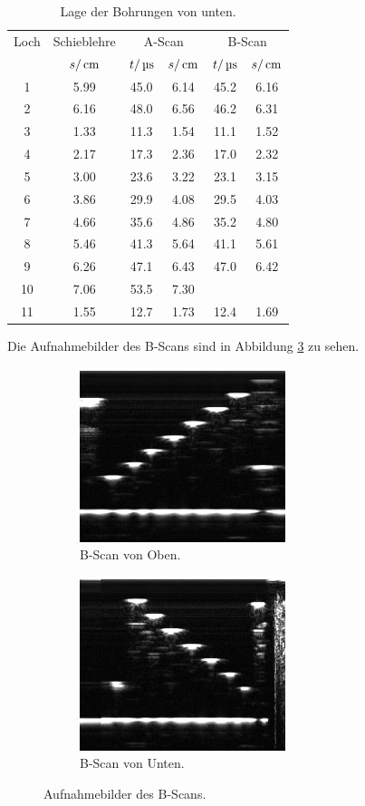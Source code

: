 \begin{table}[H]
  \centering
  \begin{tabular}{cc|cc|cc}
    \toprule
    \multicolumn{1}{c}{Loch}& \multicolumn{1}{c|}{Schieblehre} & \multicolumn{2}{c|}{A-Scan}
    & \multicolumn{2}{c}{B-Scan} \\
    & $s/\,\si{\centi\meter}$ & $t/\,\si{\micro\second}$ & $s/\,\si{\centi\meter}$ & $t/\,\si{\micro\second}$ & $s/\,\si{\centi\meter}$ \\
    \midrule
     1  &   5.99 &  45.0 & 6.14 & 45.2 & 6.16 \\
     2  &   6.16 &  48.0 & 6.56 & 46.2 & 6.31 \\
     3  &   1.33 &  11.3 & 1.54 & 11.1 & 1.52 \\
     4  &   2.17 &  17.3 & 2.36 & 17.0 & 2.32 \\
     5  &   3.00 &  23.6 & 3.22 & 23.1 & 3.15 \\
     6  &   3.86 &  29.9 & 4.08 & 29.5 & 4.03 \\
     7  &   4.66 &  35.6 & 4.86 & 35.2 & 4.80 \\
     8  &   5.46 &  41.3 & 5.64 & 41.1 & 5.61 \\
     9  &   6.26 &  47.1 & 6.43 & 47.0 & 6.42 \\
    10  &   7.06 &  53.5 & 7.30 & \hrulefill & \hrulefill \\
    11  &   1.55 &  12.7 & 1.73 & 12.4 & 1.69 \\
    \bottomrule
  \end{tabular}
  \caption{Lage der Bohrungen von unten.}
  \label{tab:unten}
\end{table}
\noindent Die Aufnahmebilder des B-Scans sind in Abbildung \ref{fig:bscan} zu sehen.
\begin{figure}[H]
  \centering
  \begin{subfigure}{0.4\textwidth}
    \includegraphics[width=6cm]{bilder/B-ScanUnten.jpg}
    \caption{B-Scan von Oben.}
    \label{sub:oben}
  \end{subfigure}
  \begin{subfigure}{0.4\textwidth}
  \includegraphics[width=6cm]{bilder/B-ScanOben.jpg}
  \caption{B-Scan von Unten.}
  \label{sub:unten}
\end{subfigure}
\caption{Aufnahmebilder des B-Scans.}
\label{fig:bscan}
\end{figure}
